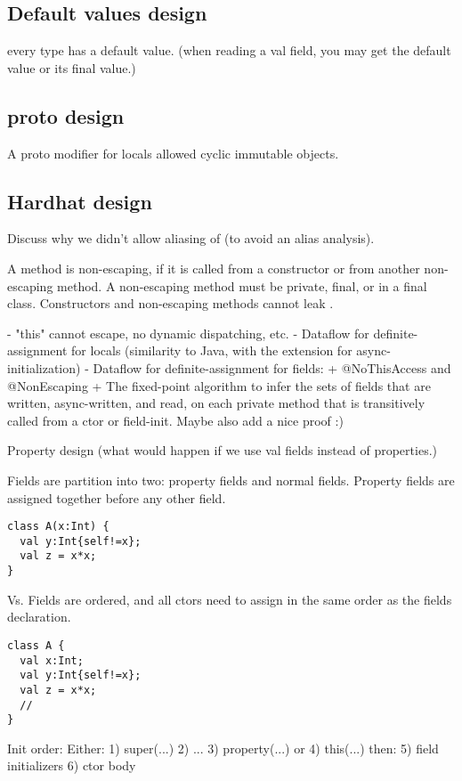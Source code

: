 

\subsection{Default values design}
every type has a default value.
(when reading a val field, you may get the default value or its final value.)

\subsection{proto design}
A proto modifier for locals
allowed cyclic immutable objects.

\subsection{Hardhat design}
\label{Section:hardhat}

Discuss why we didn't allow aliasing of \this (to avoid an alias analysis).

A method is non-escaping, if it is called from a constructor or from another non-escaping method.
A non-escaping method must be private, final, or in a final class.
Constructors and non-escaping methods cannot leak \this.


- "this" cannot escape, no dynamic dispatching, etc.
- Dataflow for definite-assignment for locals (similarity to Java, with the extension for async-initialization)
- Dataflow for definite-assignment for fields:
  + @NoThisAccess and @NonEscaping
  + The fixed-point algorithm to infer the sets of fields that are written, async-written, and read, on each private method that is transitively called from a ctor or field-init. Maybe also add a nice proof :)


Property design (what would happen if we use val fields instead of properties.)

Fields are partition into two: property fields and normal fields. Property fields are assigned together before any other field.
\begin{lstlisting}
class A(x:Int) {
  val y:Int{self!=x};
  val z = x*x;
}
\end{lstlisting}
Vs.
Fields are ordered, and all ctors need to assign in the same order as the fields declaration.
\begin{lstlisting}
class A {
  val x:Int;
  val y:Int{self!=x};
  val z = x*x;
  //
}
\end{lstlisting}


Init order:
Either:
1) super(...)
2) ...
3) property(...)
or
4) this(...)
then:
5) field initializers
6) ctor body

